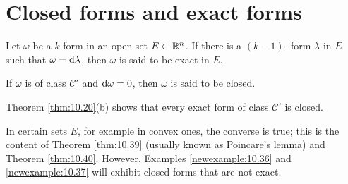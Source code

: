 
\section{Closed forms and exact forms}

\begin{mydef}
    Let $\omega$ be a $k$-form in an open set $E \subset {\protect\mathbb R}^n$. 
    If there is a $(k - 1)$- form $\lambda$ in $E$ such that $\omega = \d \lambda$, then $\omega$ is said to be exact in $E$.
    
    If $\omega$ is of class $\mathscr{C}'$ and $\d \omega = 0$, 
    then $\omega$ is said to be closed.
    
    Theorem \ref{thm:10.20}(b) shows that every exact form of class $\mathscr{C}'$ is closed.

    In certain sets $E$, for example in convex ones, the converse is true; 
    this is the content of Theorem \ref{thm:10.39} 
    (usually known as Poincare's lemma) and Theorem \ref{thm:10.40}. 
    However, Examples \ref{newexample:10.36} and \ref{newexample:10.37} will exhibit closed forms that are not exact.
\end{mydef}

\begin{myremark}
    \label{myremark:10.35}
\end{myremark}


